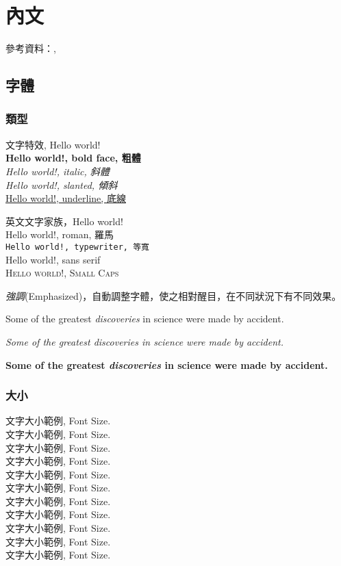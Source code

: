\chapter{內文} \label{ch_content}
參考資料：\cite{latex_basic}, \cite{latex_fbox}
\section{字體}
\subsection{類型}
文字特效, Hello world! \\
{\LARGE
\textbf{Hello world!, bold face, 粗體} \\
\textit{Hello world!, italic, 斜體} \\
\textsl{Hello world!, slanted, 傾斜} \\
\underline{Hello world!, underline, 底線} \\
}

英文文字家族，Hello world!\\
{\LARGE
\textrm{Hello world!, roman, 羅馬} \\
\texttt{Hello world!, typewriter, 等寬} \\
\textsf{Hello world!, sans serif} \\
\textsc{Hello world!, Small Caps} \\
}

\emph{強調}(Emphasized)，自動調整字體，使之相對醒目，在不同狀況下有不同效果。

Some of the greatest \emph{discoveries} 
in science 
were made by accident.

\textit{Some of the greatest \emph{discoveries} 
in science 
were made by accident.}

\textbf{Some of the greatest \emph{discoveries} 
in science 
were made by accident.}

\subsection{大小}
文字大小範例, Font Size.\\
{\tiny 文字大小範例, Font Size.}\\
{\scriptsize 文字大小範例, Font Size.}\\
{\footnotesize 文字大小範例, Font Size.}\\
{\small 文字大小範例, Font Size.}\\
{\normalsize 文字大小範例, Font Size.}\\
{\large 文字大小範例, Font Size.}\\
{\Large 文字大小範例, Font Size.}\\
{\LARGE 文字大小範例, Font Size.}\\
{\huge 文字大小範例, Font Size.} \\
{\Huge 文字大小範例, Font Size.}


